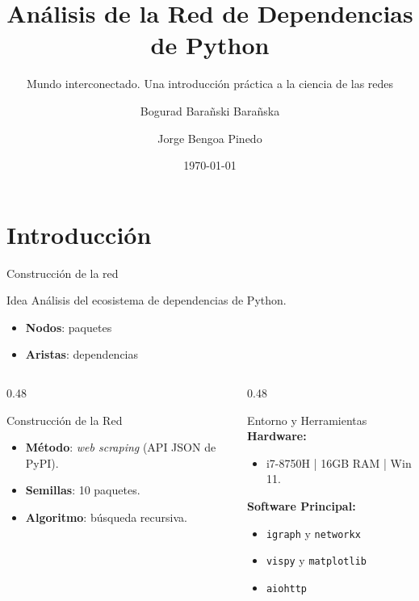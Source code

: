 \documentclass[aspectratio=169, 11pt, xcolor=table]{beamer}
\title{Análisis de la Red de Dependencias de Python}
\subtitle{Mundo interconectado. Una introducción práctica a la ciencia de las redes}
\author[B. Barañski \and J. Bengoa]{Bogurad Barañski Barañska \and Jorge Bengoa Pinedo}
\date{\today}
\begin{document}
	
	\begin{frame}
		\titlepage
	\end{frame}
	
	
	\section{Introducción}
	
	\begin{frame}{Construcción de la red}
		
		\begin{block}{Idea}
			Análisis del ecosistema de dependencias de Python. 
			\begin{itemize}
				\item \textbf{Nodos}: paquetes
				\item \textbf{Aristas}: dependencias
			\end{itemize}
		\end{block}
		
		\vspace*{-0.5cm}
		\begin{columns}[t]
			\begin{column}{0.48\textwidth}
				\begin{exampleblock}{Construcción de la Red}
					\begin{itemize}
						\item \textbf{Método}: \textit{web scraping} (API JSON de PyPI). 
						\item \textbf{Semillas}: 10 paquetes. 
						\item \textbf{Algoritmo}: búsqueda recursiva.
					\end{itemize}
				\end{exampleblock}
			\end{column}
			
			\begin{column}{0.48\textwidth}
				\begin{alertblock}{Entorno y Herramientas}
					\textbf{Hardware:} 
					\begin{itemize}
						\item i7-8750H | 16GB RAM | Win 11. 
					\end{itemize}
					\vspace{0.1cm}
					\textbf{Software Principal:} 
					\begin{itemize}
						\item \texttt{igraph} y \texttt{networkx}
						\item \texttt{vispy} y \texttt{matplotlib}
						\item \texttt{aiohttp} 
					\end{itemize}
				\end{alertblock}
			\end{column}
		\end{columns}
	\end{frame}
	
\end{document}
